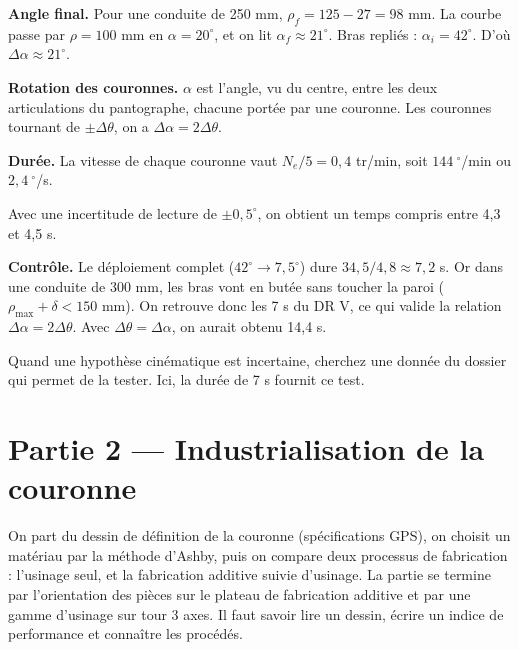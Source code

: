 \documentclass[11pt,a4paper]{article}
\newcommand{\equationajustee}[1]{%
  \sbox{\boiteequation}{$\displaystyle #1$}%
  \ifdim\wd\boiteequation>\linewidth
    \[\resizebox{\linewidth}{!}{\usebox{\boiteequation}}\]%
  \else
    \[#1\]%
  \fi}
\begin{document}
\textbf{Angle final.} Pour une conduite de 250 mm, \(\rho_f = 125 - 27 = 98\) mm. La courbe passe par \(\rho = 100\) mm en \(\alpha = 20^\circ\), et on lit \(\alpha_f \approx 21^\circ\). Bras repliés : \(\alpha_i = 42^\circ\). D'où \(\Delta\alpha \approx 21^\circ\).

\textbf{Rotation des couronnes.} \(\alpha\) est l'angle, vu du centre, entre les deux articulations du pantographe, chacune portée par une couronne. Les couronnes tournant de \(\pm\Delta\theta\), on a \(\Delta\alpha = 2\Delta\theta\).

\textbf{Durée.} La vitesse de chaque couronne vaut \(N_e/5 = 0{,}4\) tr/min, soit \(144\ ^\circ\)/min ou \(2{,}4\ ^\circ\)/s.

\equationajustee{\begin{aligned}
t_d &= \frac{\Delta\alpha}{2\times 2{,}4} \\
&= \frac{21}{4{,}8}\ \text{s}
\end{aligned}}

\equationajustee{\boxed{t_d\approx 4{,}4\ \text{s}}}

Avec une incertitude de lecture de \(\pm 0{,}5^\circ\), on obtient un temps compris entre 4,3 et 4,5 s.

\textbf{Contrôle.} Le déploiement complet (\(42^\circ\to 7{,}5^\circ\)) dure \(34{,}5/4{,}8 \approx 7{,}2\) s. Or dans une conduite de 300 mm, les bras vont en butée sans toucher la paroi (\(\rho_{\max} + \delta < 150\) mm). On retrouve donc les 7 s du DR V, ce qui valide la relation \(\Delta\alpha = 2\Delta\theta\). Avec \(\Delta\theta = \Delta\alpha\), on aurait obtenu 14,4 s.

\begin{methode}

Quand une hypothèse cinématique est incertaine, cherchez une donnée du dossier qui permet de la tester. Ici, la durée de 7 s fournit ce test.

\end{methode}

\hypertarget{partie-2-industrialisation-de-la-couronne}{%
\section{Partie 2 --- Industrialisation de la couronne}\label{partie-2-industrialisation-de-la-couronne}}

On part du dessin de définition de la couronne (spécifications GPS), on choisit un matériau par la méthode d'Ashby, puis on compare deux processus de fabrication : l'usinage seul, et la fabrication additive suivie d'usinage. La partie se termine par l'orientation des pièces sur le plateau de fabrication additive et par une gamme d'usinage sur tour 3 axes. Il faut savoir lire un dessin, écrire un indice de performance et connaître les procédés.
\end{document}
